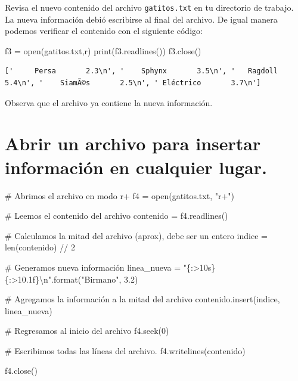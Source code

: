 \documentclass[
  spanish,
  letterpaper,
]{scrbook}
\newenvironment{Shaded}{\begin{snugshade}}{\end{snugshade}}
\newcommand{\BuiltInTok}[1]{\textcolor[rgb]{0.00,0.23,0.31}{#1}}
\newcommand{\CharTok}[1]{\textcolor[rgb]{0.13,0.47,0.30}{#1}}
\newcommand{\CommentTok}[1]{\textcolor[rgb]{0.37,0.37,0.37}{#1}}
\newcommand{\DecValTok}[1]{\textcolor[rgb]{0.68,0.00,0.00}{#1}}
\newcommand{\FloatTok}[1]{\textcolor[rgb]{0.68,0.00,0.00}{#1}}
\newcommand{\NormalTok}[1]{\textcolor[rgb]{0.00,0.23,0.31}{#1}}
\newcommand{\OperatorTok}[1]{\textcolor[rgb]{0.37,0.37,0.37}{#1}}
\newcommand{\SpecialCharTok}[1]{\textcolor[rgb]{0.37,0.37,0.37}{#1}}
\newcommand{\StringTok}[1]{\textcolor[rgb]{0.13,0.47,0.30}{#1}}
\theoremstyle{definition}
\theoremstyle{remark}
\begin{document}
Revisa el nuevo contenido del archivo \texttt{gatitos.txt} en tu
directorio de trabajo. La nueva información debió escribirse al final
del archivo. De igual manera podemos verificar el contenido con el
siguiente código:

\begin{Shaded}
\begin{Highlighting}[]
\NormalTok{f3 }\OperatorTok{=} \BuiltInTok{open}\NormalTok{(}\StringTok{\textquotesingle{}gatitos.txt\textquotesingle{}}\NormalTok{,}\StringTok{\textquotesingle{}r\textquotesingle{}}\NormalTok{)}
\BuiltInTok{print}\NormalTok{(f3.readlines())}
\NormalTok{f3.close()}
\end{Highlighting}
\end{Shaded}

\begin{verbatim}
['     Persa       2.3\n', '    Sphynx       3.5\n', '   Ragdoll       5.4\n', '    SiamÃ©s       2.5\n', ' Eléctrico       3.7\n']
\end{verbatim}

Observa que el archivo ya contiene la nueva información.

\section{Abrir un archivo para insertar información en cualquier
lugar.}\label{abrir-un-archivo-para-insertar-informaciuxf3n-en-cualquier-lugar.}

\begin{Shaded}
\begin{Highlighting}[]
\CommentTok{\# Abrimos el archivo en modo \textquotesingle{}r+\textquotesingle{}}
\NormalTok{f4 }\OperatorTok{=} \BuiltInTok{open}\NormalTok{(}\StringTok{\textquotesingle{}gatitos.txt\textquotesingle{}}\NormalTok{, }\StringTok{"r+"}\NormalTok{)}

\CommentTok{\# Leemos el contenido del archivo}
\NormalTok{contenido }\OperatorTok{=}\NormalTok{ f4.readlines()}

\CommentTok{\# Calculamos la mitad del archivo (aprox), debe ser un entero}
\NormalTok{indice }\OperatorTok{=} \BuiltInTok{len}\NormalTok{(contenido) }\OperatorTok{//} \DecValTok{2}

\CommentTok{\# Generamos nueva información}
\NormalTok{linea\_nueva }\OperatorTok{=} \StringTok{"}\SpecialCharTok{\{:\textgreater{}10s\}\{:\textgreater{}10.1f\}}\CharTok{\textbackslash{}n}\StringTok{"}\NormalTok{.}\BuiltInTok{format}\NormalTok{(}\StringTok{"Birmano"}\NormalTok{, }\FloatTok{3.2}\NormalTok{)}

\CommentTok{\# Agregamos la información a la mitad del archivo}
\NormalTok{contenido.insert(indice, linea\_nueva)}

\CommentTok{\# Regresamos al inicio del archivo}
\NormalTok{f4.seek(}\DecValTok{0}\NormalTok{)}

\CommentTok{\# Escribimos todas las líneas del archivo.}
\NormalTok{f4.writelines(contenido)}

\NormalTok{f4.close()}
\end{Highlighting}
\end{Shaded}
\end{document}
